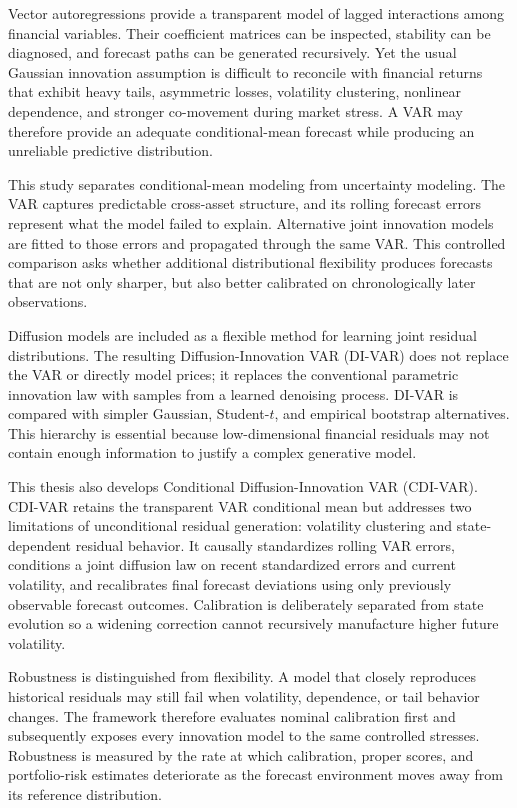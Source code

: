 \documentclass[11pt]{article}
\begin{document}
Vector autoregressions provide a transparent model of lagged interactions among financial variables. Their coefficient matrices can be inspected, stability can be diagnosed, and forecast paths can be generated recursively. Yet the usual Gaussian innovation assumption is difficult to reconcile with financial returns that exhibit heavy tails, asymmetric losses, volatility clustering, nonlinear dependence, and stronger co-movement during market stress. A VAR may therefore provide an adequate conditional-mean forecast while producing an unreliable predictive distribution.

This study separates conditional-mean modeling from uncertainty modeling. The VAR captures predictable cross-asset structure, and its rolling forecast errors represent what the model failed to explain. Alternative joint innovation models are fitted to those errors and propagated through the same VAR. This controlled comparison asks whether additional distributional flexibility produces forecasts that are not only sharper, but also better calibrated on chronologically later observations.

Diffusion models are included as a flexible method for learning joint residual distributions. The resulting Diffusion-Innovation VAR (DI-VAR) does not replace the VAR or directly model prices; it replaces the conventional parametric innovation law with samples from a learned denoising process. DI-VAR is compared with simpler Gaussian, Student-$t$, and empirical bootstrap alternatives. This hierarchy is essential because low-dimensional financial residuals may not contain enough information to justify a complex generative model.

This thesis also develops Conditional Diffusion-Innovation VAR (CDI-VAR). CDI-VAR retains the transparent VAR conditional mean but addresses two limitations of unconditional residual generation: volatility clustering and state-dependent residual behavior. It causally standardizes rolling VAR errors, conditions a joint diffusion law on recent standardized errors and current volatility, and recalibrates final forecast deviations using only previously observable forecast outcomes. Calibration is deliberately separated from state evolution so a widening correction cannot recursively manufacture higher future volatility.

Robustness is distinguished from flexibility. A model that closely reproduces historical residuals may still fail when volatility, dependence, or tail behavior changes. The framework therefore evaluates nominal calibration first and subsequently exposes every innovation model to the same controlled stresses. Robustness is measured by the rate at which calibration, proper scores, and portfolio-risk estimates deteriorate as the forecast environment moves away from its reference distribution.
\end{document}
